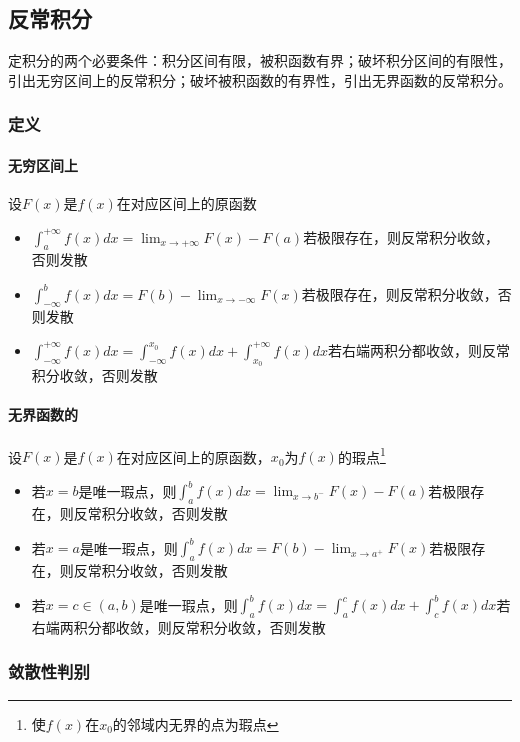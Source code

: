 \subsection{反常积分}
定积分的两个必要条件：积分区间有限，被积函数有界；破坏积分区间的有限性，引出无穷区间上的反常积分；破坏被积函数的有界性，引出无界函数的反常积分。
\subsubsection{定义}

\paragraph{无穷区间上}
设\(F(x)\)是\(f(x)\)在对应区间上的原函数
\begin{itemize}
    \item \(\displaystyle\int_a^{+\infty}f(x)dx = \lim_{x \to +\infty}F(x) - F(a)\)若极限存在，则反常积分收敛，否则发散
    \item \(\displaystyle\int_{-\infty}^bf(x)dx = F(b) - \lim_{x \to -\infty}F(x)\)若极限存在，则反常积分收敛，否则发散
    \item \(\displaystyle\int_{-\infty}^{+\infty}f(x)dx = \int_{-\infty}^{x_0}f(x)dx + \int_{x_0}^{+\infty}f(x)dx\)若右端两积分都收敛，则反常积分收敛，否则发散
\end{itemize}

\paragraph{无界函数的}
设\(F(x)\)是\(f(x)\)在对应区间上的原函数，\(x_0\)为\(f(x)\)的瑕点\footnote{使\(f(x)\)在\(x_0\)的邻域内无界的点为瑕点}
\begin{itemize}
    \item 若\(x = b\)是唯一瑕点，则\(\displaystyle\int_a^{b}f(x)dx = \lim_{x \to b^-}F(x) - F(a)\)若极限存在，则反常积分收敛，否则发散
    \item 若\(x = a\)是唯一瑕点，则\(\displaystyle\int_{a}^bf(x)dx = F(b) - \lim_{x \to a^+}F(x)\)若极限存在，则反常积分收敛，否则发散
    \item 若\(x = c \in (a, b)\)是唯一瑕点，则\(\displaystyle\int_{a}^{b}f(x)dx = \int_{a}^{c}f(x)dx + \int_{c}^{b}f(x)dx\)若右端两积分都收敛，则反常积分收敛，否则发散
\end{itemize}


\subsubsection{敛散性判别}

